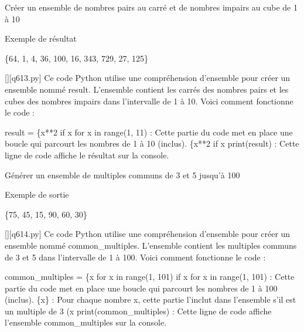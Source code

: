         \question
        Créer un ensemble de nombres pairs au carré et de nombres impairs au cube de 1 à 10

Exemple de résultat

\{64, 1, 4, 36, 100, 16, 343, 729, 27, 125\}
        \par
        \begin{solution}
            \renewcommand{\nomfichier}{q613.py}
            \pythonfile{\chemincode \nomfichier}[][\nomfichier]
            Ce code Python utilise une compréhension d'ensemble pour créer un ensemble nommé result. L'ensemble contient les carrés des nombres pairs et les cubes des nombres impairs dans l'intervalle de 1 à 10. Voici comment fonctionne le code :

    result = \{x**2 if x %
        for x in range(1, 11) : Cette partie du code met en place une boucle qui parcourt les nombres de 1 à 10 (inclus).
        \{x**2 if x %
    print(result) : Cette ligne de code affiche le résultat sur la console.
        \end{solution}
        

        \question
        Générer un ensemble de multiples communs de 3 et 5 jusqu'à 100

Exemple de sortie

\{75, 45, 15, 90, 60, 30\}
        \par
        \begin{solution}
            \renewcommand{\nomfichier}{q614.py}
            \pythonfile{\chemincode \nomfichier}[][\nomfichier]
            Ce code Python utilise une compréhension d'ensemble pour créer un ensemble nommé common\_multiples. L'ensemble contient les multiples communs de 3 et 5 dans l'intervalle de 1 à 100. Voici comment fonctionne le code :

    common\_multiples = \{x for x in range(1, 101) if x %
        for x in range(1, 101) : Cette partie du code met en place une boucle qui parcourt les nombres de 1 à 100 (inclus).
        \{x\} : Pour chaque nombre x, cette partie l'inclut dans l'ensemble s'il est un multiple de 3 (x %
    print(common\_multiples) : Cette ligne de code affiche l'ensemble common\_multiples sur la console.
        \end{solution}
        

